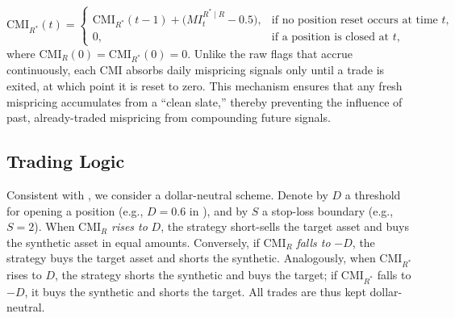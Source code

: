 $$
\mathrm{CMI}_{R^*}(t) =
\begin{cases}
\mathrm{CMI}_{R^*}(t-1) + \bigl(MI_t^{R^*\mid R} - 0.5\bigr), & \text{if no position reset occurs at time } t,\\
0, & \text{if a position is closed at } t,
\end{cases}
$$
where \(\mathrm{CMI}_R(0)= \mathrm{CMI}_{R^*}(0)=0\). Unlike the raw flags that accrue continuously, each CMI absorbs daily mispricing signals only until a trade is exited, at which point it is reset to zero. This mechanism ensures that any fresh mispricing accumulates from a ``clean slate,'' thereby preventing the influence of past, already-traded mispricing from compounding future signals.
%
%
%
\subsection{Trading Logic}

Consistent with \cite{xie2016mpi}, we consider a dollar-neutral scheme. 
Denote by $D$ a threshold for opening a position (e.g., $D=0.6$ in \cite{xie2016mpi}), and by $S$ a stop-loss boundary (e.g., $S=2$).
%
When $\text{CMI}_R$ \emph{rises to} $D$, the strategy short-sells the target asset and buys the synthetic asset in equal amounts. Conversely, if $\text{CMI}_R$ \emph{falls to} $-D$, the strategy buys the target asset and shorts the synthetic. Analogously, when $\text{CMI}_{R^*}$ rises to $D$, the strategy shorts the synthetic and buys the target; if $\text{CMI}_{R^*}$ falls to $-D$, it buys the synthetic and shorts the target. All trades are thus kept dollar-neutral.

